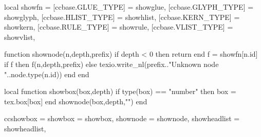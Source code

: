 local showfn = {
  [ccbase.GLUE_TYPE]  = showglue,
  [ccbase.GLYPH_TYPE] = showglyph,
  [ccbase.HLIST_TYPE] = showhlist,
  [ccbase.KERN_TYPE]  = showkern,
  [ccbase.RULE_TYPE]  = showrule,
  [ccbase.VLIST_TYPE] = showvlist,
}

function shownode(n,depth,prefix)
  if depth < 0 then return end
  f = showfn[n.id]
  if f then
    f(n,depth,prefix)
  else
    texio.write_nl(prefix.."Unknown node "..node.type(n.id))
  end
end

local function showbox(box,depth)
  if type(box) == "number" then box = tex.box[box] end
  shownode(box,depth,"")
end

ccshowbox = {
  showbox  = showbox,
  shownode = shownode,
  showheadlist = showheadlist,
}
\endluacode
\def\ccshowbox#1#2{\directlua{ccshowbox.showbox(#1,#2)}}
\endinput

